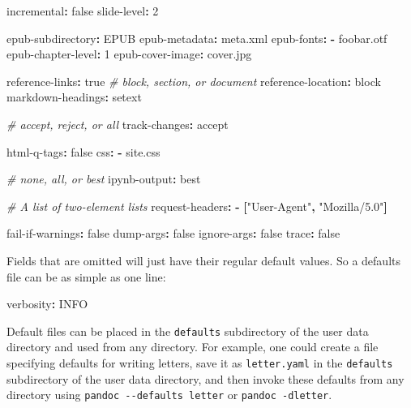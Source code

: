 \documentclass[]{article}
\newenvironment{Shaded}{}{}
\newcommand{\AttributeTok}[1]{\textcolor[rgb]{0.49,0.56,0.16}{#1}}
\newcommand{\CharTok}[1]{\textcolor[rgb]{0.25,0.44,0.63}{#1}}
\newcommand{\CommentTok}[1]{\textcolor[rgb]{0.38,0.63,0.69}{\textit{#1}}}
\newcommand{\DecValTok}[1]{\textcolor[rgb]{0.25,0.63,0.44}{#1}}
\newcommand{\FunctionTok}[1]{\textcolor[rgb]{0.02,0.16,0.49}{#1}}
\newcommand{\KeywordTok}[1]{\textcolor[rgb]{0.00,0.44,0.13}{\textbf{#1}}}
\newcommand{\StringTok}[1]{\textcolor[rgb]{0.25,0.44,0.63}{#1}}
\begin{document}
\begin{Shaded}
\begin{Highlighting}[]
\FunctionTok{incremental}\KeywordTok{:}\AttributeTok{ }\CharTok{false}
\FunctionTok{slide{-}level}\KeywordTok{:}\AttributeTok{ }\DecValTok{2}

\FunctionTok{epub{-}subdirectory}\KeywordTok{:}\AttributeTok{ EPUB}
\FunctionTok{epub{-}metadata}\KeywordTok{:}\AttributeTok{ meta.xml}
\FunctionTok{epub{-}fonts}\KeywordTok{:}
\KeywordTok{{-}}\AttributeTok{ foobar.otf}
\FunctionTok{epub{-}chapter{-}level}\KeywordTok{:}\AttributeTok{ }\DecValTok{1}
\FunctionTok{epub{-}cover{-}image}\KeywordTok{:}\AttributeTok{ cover.jpg}

\FunctionTok{reference{-}links}\KeywordTok{:}\AttributeTok{ }\CharTok{true}
\CommentTok{\# block, section, or document}
\FunctionTok{reference{-}location}\KeywordTok{:}\AttributeTok{ block}
\FunctionTok{markdown{-}headings}\KeywordTok{:}\AttributeTok{ setext}

\CommentTok{\# accept, reject, or all}
\FunctionTok{track{-}changes}\KeywordTok{:}\AttributeTok{ accept}

\FunctionTok{html{-}q{-}tags}\KeywordTok{:}\AttributeTok{ }\CharTok{false}
\FunctionTok{css}\KeywordTok{:}
\KeywordTok{{-}}\AttributeTok{ site.css}

\CommentTok{\# none, all, or best}
\FunctionTok{ipynb{-}output}\KeywordTok{:}\AttributeTok{ best}

\CommentTok{\# A list of two{-}element lists}
\FunctionTok{request{-}headers}\KeywordTok{:}
\KeywordTok{{-}}\AttributeTok{ }\KeywordTok{[}\StringTok{"User{-}Agent"}\KeywordTok{,}\AttributeTok{ }\StringTok{"Mozilla/5.0"}\KeywordTok{]}

\FunctionTok{fail{-}if{-}warnings}\KeywordTok{:}\AttributeTok{ }\CharTok{false}
\FunctionTok{dump{-}args}\KeywordTok{:}\AttributeTok{ }\CharTok{false}
\FunctionTok{ignore{-}args}\KeywordTok{:}\AttributeTok{ }\CharTok{false}
\FunctionTok{trace}\KeywordTok{:}\AttributeTok{ }\CharTok{false}
\end{Highlighting}
\end{Shaded}

Fields that are omitted will just have their regular default values. So
a defaults file can be as simple as one line:

\begin{Shaded}
\begin{Highlighting}[]
\FunctionTok{verbosity}\KeywordTok{:}\AttributeTok{ INFO}
\end{Highlighting}
\end{Shaded}

Default files can be placed in the \texttt{defaults} subdirectory of the
user data directory and used from any directory. For example, one could
create a file specifying defaults for writing letters, save it as
\texttt{letter.yaml} in the \texttt{defaults} subdirectory of the user
data directory, and then invoke these defaults from any directory using
\texttt{pandoc\ -\/-defaults\ letter} or \texttt{pandoc\ -dletter}.
\end{document}
